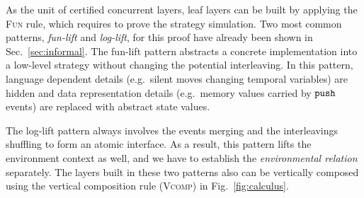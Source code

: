 %

As the unit of certified concurrent layers, leaf layers can be built by applying the \textsc{Fun} rule, which requires to prove the strategy simulation.
Two most common patterns, \emph{fun-lift} and \emph{log-lift}, for this proof have already been shown in Sec.~\ref{sec:informal}.
The fun-lift pattern abstracts a concrete implementation into a low-level strategy without changing the potential interleaving. In this pattern, language dependent details (e.g.\, silent moves changing temporal variables) are hidden
and data representation details (e.g.\, memory values carried by ${\mathrm{\texttt{push}}}$ events) are replaced with abstract state values.


The log-lift pattern always involves the events merging
and the interleavings shuffling to form an atomic interface.
As a result, this pattern lifts the environment context as well,
and we have to establish the \emph{environmental relation} separately.
The layers built in these two patterns also can be vertically
composed using the vertical composition rule (\textsc{Vcomp}) in Fig.~\ref{fig:calculus}.
